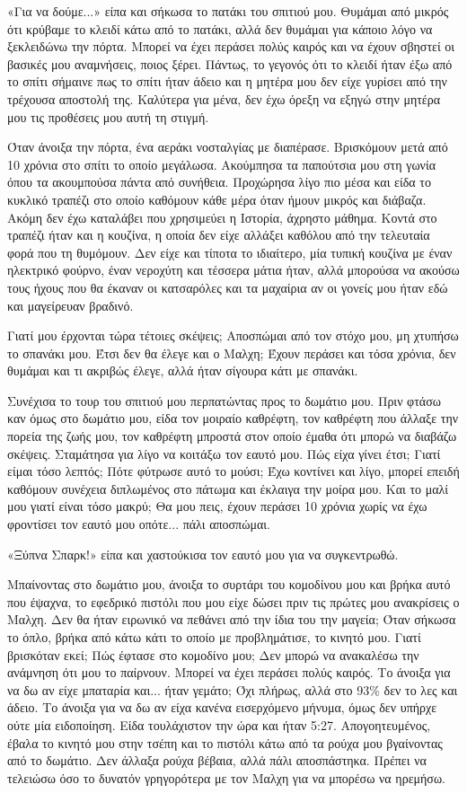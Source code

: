 \documentclass[12pt,twoside, openany]{book}
\begin{document}
«Για να δούμε...» είπα και σήκωσα το πατάκι του σπιτιού μου. Θυμάμαι από μικρός ότι κρύβαμε το κλειδί κάτω από το πατάκι, αλλά δεν θυμάμαι για κάποιο λόγο να ξεκλειδώνω την πόρτα. Μπορεί να έχει περάσει πολύς καιρός και να έχουν σβηστεί οι βασικές μου αναμνήσεις, ποιος ξέρει. Πάντως, το γεγονός ότι το κλειδί ήταν έξω από το σπίτι σήμαινε πως το σπίτι ήταν άδειο και η μητέρα μου δεν είχε γυρίσει από την τρέχουσα αποστολή της. Καλύτερα για μένα, δεν έχω όρεξη να εξηγώ στην μητέρα μου τις προθέσεις μου αυτή τη στιγμή.

Όταν άνοιξα την πόρτα, ένα αεράκι νοσταλγίας με διαπέρασε. Βρισκόμουν μετά από 10 χρόνια στο σπίτι το οποίο μεγάλωσα. Ακούμπησα τα παπούτσια μου στη γωνία όπου τα ακουμπούσα πάντα από συνήθεια. Προχώρησα λίγο πιο μέσα και είδα το κυκλικό τραπέζι στο οποίο καθόμουν κάθε μέρα όταν ήμουν μικρός και διάβαζα. Ακόμη δεν έχω καταλάβει που χρησιμεύει η Ιστορία, άχρηστο μάθημα. Κοντά στο τραπέζι ήταν και η κουζίνα, η οποία δεν είχε αλλάξει καθόλου από την τελευταία φορά που τη θυμόμουν. Δεν είχε και τίποτα το ιδιαίτερο, μία τυπική κουζίνα με έναν ηλεκτρικό φούρνο, έναν νεροχύτη και τέσσερα μάτια ήταν, αλλά μπορούσα να ακούσω τους ήχους που θα έκαναν οι κατσαρόλες και τα μαχαίρια αν οι γονείς μου ήταν εδώ και μαγείρευαν βραδινό.

Γιατί μου έρχονται τώρα τέτοιες σκέψεις; Αποσπώμαι από τον στόχο μου, μη χτυπήσω το σπανάκι μου. Έτσι δεν θα έλεγε και ο Μαλχη; Έχουν περάσει και τόσα χρόνια, δεν θυμάμαι και τι ακριβώς έλεγε, αλλά ήταν σίγουρα κάτι με σπανάκι.

Συνέχισα το τουρ του σπιτιού μου περπατώντας προς το δωμάτιο μου. Πριν φτάσω καν όμως στο δωμάτιο μου, είδα τον μοιραίο καθρέφτη, τον καθρέφτη που άλλαξε την πορεία της ζωής μου, τον καθρέφτη μπροστά στον οποίο έμαθα ότι μπορώ να διαβάζω σκέψεις. Σταμάτησα για λίγο να κοιτάξω τον εαυτό μου. Πώς είχα γίνει έτσι; Γιατί είμαι τόσο λεπτός; Πότε φύτρωσε αυτό το μούσι; Έχω κοντίνει και λίγο, μπορεί επειδή καθόμουν συνέχεια διπλωμένος στο πάτωμα και έκλαιγα την μοίρα μου. Και το μαλί μου γιατί είναι τόσο μακρύ; Θα μου πεις, έχουν περάσει 10 χρόνια χωρίς να έχω φροντίσει τον εαυτό μου οπότε... πάλι αποσπώμαι.

«Ξύπνα Σπαρκ!» είπα και χαστούκισα τον εαυτό μου για να συγκεντρωθώ.

Μπαίνοντας στο δωμάτιο μου, άνοιξα το συρτάρι του κομοδίνου μου και βρήκα αυτό που έψαχνα, το εφεδρικό πιστόλι  που μου είχε δώσει πριν τις πρώτες μου ανακρίσεις ο Μαλχη. Δεν θα ήταν ειρωνικό να πεθάνει από την ίδια του την μαγεία; Όταν σήκωσα το όπλο, βρήκα από κάτω κάτι το οποίο με προβλημάτισε, το κινητό μου. Γιατί βρισκόταν εκεί; Πώς έφτασε στο κομοδίνο μου; Δεν μπορώ να ανακαλέσω την ανάμνηση ότι μου το παίρνουν. Μπορεί να έχει περάσει πολύς καιρός. Το άνοιξα για να δω αν είχε μπαταρία και... ήταν γεμάτο; Όχι πλήρως, αλλά στο 93\% δεν το λες και άδειο. Το άνοιξα για να δω αν είχα κανένα εισερχόμενο μήνυμα, όμως δεν υπήρχε ούτε μία ειδοποίηση. Είδα τουλάχιστον την ώρα και ήταν 5:27. Απογοητευμένος, έβαλα το κινητό μου στην τσέπη και το πιστόλι κάτω από τα ρούχα μου βγαίνοντας από το δωμάτιο. Δεν άλλαξα ρούχα βέβαια, αλλά πάλι αποσπάστηκα. Πρέπει να τελειώσω όσο το δυνατόν γρηγορότερα με τον Μαλχη για να μπορέσω να ηρεμήσω.
\end{document}
